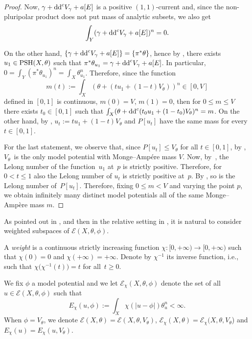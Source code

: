 \documentclass[pdftex]{sigma}
\numberwithin{equation}{section}
\theoremstyle{plain}
\newcommand \PSH {{\rm PSH}}
\begin{document}
\begin{proof}
Now, $\gamma+{\rm dd}^c V_\gamma + a[E]$ is a positive $(1,1)$-current and, since the non-pluripolar product does not put mass of analytic subsets, we also get
\[\int_Y ( \gamma +{\rm dd}^c V_\gamma + a[E])^n = 0. \]

On the other hand, $\{\gamma+{\rm dd}^c V_\gamma + a[E]\}= \{ \pi^*\theta \}$, hence by \cite[Proposition 1.2.4]{BouThesis}, there exists~${u_1\in \PSH(X,\theta)}$ such that
$\pi^*\theta_{u_1} = \gamma +{\rm dd}^c V_\gamma + a[E]$.
In particular, $ 0=\int_Y (\pi^*\theta_{u_1})^n =\int_X \theta_{u_1}^n $.
Therefore, since the function
\[m(t) := \int_X ( \theta + (t u_1 + (1-t) V_\theta))^n \in [0, V] \]
defined in $[0,1]$ is continuous, $m(0)=V$, $m(1)=0$, then for $0 \leq m \leq V$ there exists $t_0\in [0,1]$ such that $\int_X (\theta + {\rm dd}^c ( t_0 u_1 + (1-t_0) V_\theta)^n = m$. On the other hand, by \cite[Remark 3.4]{DDL6}, $u_t := tu_1 + (1-t)V_\theta$ and $P[u_t]$ have the same mass for every $t \in [0,1]$.

For the last statement, we observe that, since $P[u_t] \leq V_\theta$ for all $t \in [0,1]$, by \cite[Theorem~3.14]{DDL6}, $V_\theta$~is the only model potential with Monge--Amp\'ere mass $V$. Now, by~\cite[Corollary~1.18]{BouThesis}, the Lelong number of the function~$u_1$ at~$p$ is strictly positive. Therefore, for $0 < t \leq 1$ also the Lelong number of $u_t$ is strictly positive at~$p$. By \cite[Lemma~5.1]{DDL6}, so is the Lelong number of~$P[u_t]$. Therefore, fixing $0 \leq m < V$ and varying the point $p$, we obtain infinitely many distinct model potentials all of the same Monge--Amp\`ere mass $m$.
\end{proof}

As pointed out in \cite{GZ07}, and then in the relative setting in \cite{Gup23}, it is natural to consider weighted subspaces of $\mathcal E(X,\theta,\phi)$.

A \emph{weight} is a continuous strictly increasing function $\chi\colon [0,+\infty) \rightarrow [0,+\infty)$ such that $\chi(0)=0$ and $\chi(+\infty)=+\infty$. Denote by $\chi^{-1}$ its inverse function, i.e., such that $\chi\big(\chi^{-1}(t)\big)= t$ for all~${t\geq 0}$.

We fix $\phi$ a model potential and we let $\mathcal{E}_{\chi}(X,\theta,\phi)$ denote the set of all $u\in \mathcal{E}(X,\theta,\phi)$ such that
\[
E_{\chi}(u,\phi):=\int_X \chi(|u-\phi|) \theta_u^n <\infty.
\]
When $\phi=V_{\theta}$, we denote $\mathcal{E}(X,\theta)=\mathcal{E}(X,\theta,V_{\theta})$, $\mathcal{E}_{\chi}(X,\theta)=\mathcal{E}_{\chi}(X,\theta,V_{\theta}$) and $E_{\chi}(u)=E_{\chi}(u,V_{\theta})$.
\end{document}
